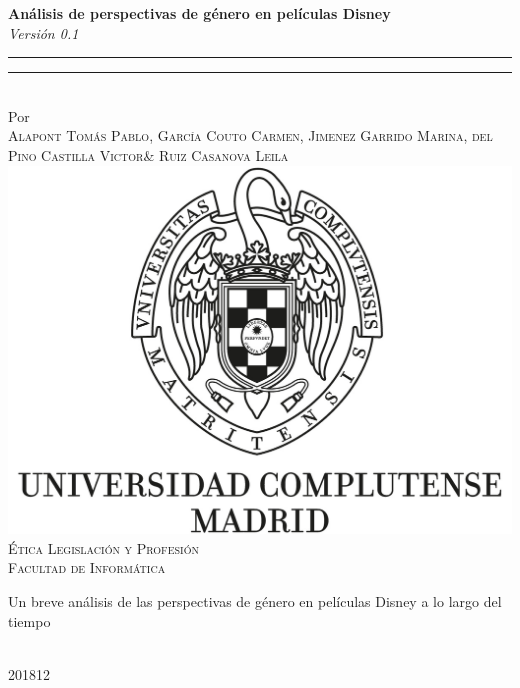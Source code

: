 \begin{center}
    {\textbf{Análisis de perspectivas de género en películas Disney} }\\[4mm] %
    {\Large \textit{Versión 0.1}}\\ %
    \rule[0.5ex]{\linewidth}{1pt}\vspace*{-\baselineskip}\vspace{3.2pt}
    \rule[0.5ex]{\linewidth}{2pt}\\
    \vspace{6.5mm}
    {\large Por}\\ 
    \vspace{6.5mm}
    {
        \large{\textsc{Alapont Tomás Pablo}},
        \large{\textsc{García Couto Carmen}},
        \large{\textsc{Jimenez Garrido Marina}},
        \large{\textsc{del Pino Castilla Victor}}\&
        \large{\textsc{Ruiz Casanova Leila}}
    }\\ %
    \vspace{11mm}
    \includegraphics[scale=0.3]{Images/logo_UCM.jpg}\\ %
    \vspace{6mm}
    {\large \textsc{Ética Legislación y Profesión}\\  %
    \textsc{Facultad de Informática}}\\ %
    \vspace{11mm}
    \begin{minipage}{12cm}
    Un breve análisis de las perspectivas de género en películas Disney a lo largo del tiempo
    \end{minipage}\\
    \vspace{9mm}
    {\large\textsc{201812}} %
    \vspace{12mm}
\end{center}
